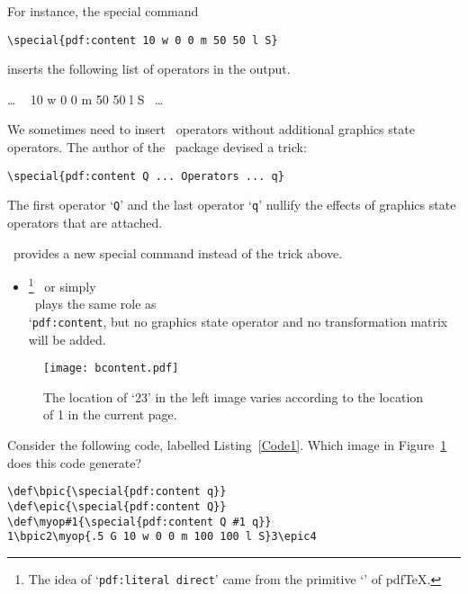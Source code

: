 \documentclass[final]{ltugboat}
\def\DPM{\acro{DVI\-PDFM}}
\let\DPX\DVIPDFMx
\def\pdfTeX{pdf\/\TeX}
\def\fafter{1.5pt}
\let\note=\footnote
\begin{document}
For instance, the special command

\begin{verbatim}
\special{pdf:content 10 w 0 0 m 50 50 l S}
\end{verbatim}

\noindent
inserts the following list of operators in the output.

\smallskip\noindent
{\fontsize{9pt}{11pt}\selectfont
\ttfamily\ldots\,%
\,\,%
10 w 0 0 m 50 50 l S
\,%
\ldots
}

We sometimes need to insert \PDF\ operators without additional graphics state operators.
The author of the \PGF\ package devised a trick:

{\hfuzz=5pt
\begin{verbatim}
\special{pdf:content Q ... Operators ... q}
\end{verbatim}
}

\noindent
The first operator `\texttt{Q}' and the last operator `\texttt{q}' nullify the effects of graphics state operators that are attached.

\DPX\ provides a new special command instead of the trick above.

\begin{itemize}
\item{}\note{%
The idea of `\texttt{pdf:literal direct}' came from the primitive `' of \pdfTeX.} \ or simply\\[\fafter]
 \ plays the same role as\\[\fafter]
`\texttt{pdf:content}, but no graphics state operator and no
transformation matrix will be added.
\end{itemize}

\begin{figure}[h]
\centering\texttt{[image: bcontent.pdf]}
\caption{The location of `23' in the left image varies according to the location of 1 in the current page.}
\label{Figure2}
\end{figure}

Consider the following code, labelled Listing~\ref{Code1}. Which image in Figure~\ref{Figure2} does this code generate?

\renewcommand{\tablename}{Listing}
\setcounter{table}{0}
\begin{table}[h] 
\hfuzz=5pt
\fontsize{9pt}{11pt}\selectfont
\begin{verbatim}
\def\bpic{\special{pdf:content q}}
\def\epic{\special{pdf:content Q}}
\def\myop#1{\special{pdf:content Q #1 q}}
1\bpic2\myop{.5 G 10 w 0 0 m 100 100 l S}3\epic4
\end{verbatim}
\caption{Which image in Figure~\ref{Figure2} is the result of this code, produced by \DPM($x$)?}
\label{Code1}
\end{table}
\end{document}
